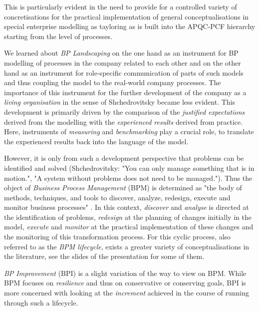 \documentclass[11pt,a4paper]{article}
\begin{document}
This is particularly evident in the need to provide for a controlled variety
of concretisations for the practical implementation of general
conceptualisations in special enterprise modelling as tayloring as is built
into the APQC-PCF hierarchy starting from the level of processes.

We learned about \emph{BP Landscaping} on the one hand as an instrument for BP
modelling of processes in the company related to each other and on the other
hand as an instrument for role-specific communication of parts of such models
and thus coupling the model to the real-world company processes. The
importance of this instrument for the further development of the company as a
\emph{living organisation} in the sense of Shchedrovitsky became less evident.
This development is primarily driven by the comparison of the \emph{justified
  expectations} derived from the modelling with the \emph{experienced results}
derived from practice. Here, instruments of \emph{measuring} and
\emph{benchmarking} play a crucial role, to translate the experienced results
back into the language of the model.

However, it is only from such a development perspective that problems can be
identified and solved (Shchedrovitsky: "You can only manage something that is
in motion.", "A system without problems does not need to be managed."). Thus
the object of \emph{Business Process Management} (BPM) is determined as "the
body of methods, techniques, and tools to discover, analyze, redesign, execute
and monitor business processes" \cite{Lindskog2018}. In this context,
\emph{discover} and \emph{analyse} is directed at the identification of
problems, \emph{redesign} at the planning of changes initially in the model,
\emph{execute} and \emph{monitor} at the practical implementation of these
changes and the monitoring of this transformation process. For this cyclic
process, also referred to as the \emph{BPM lifecycle}, exists a greater
variety of conceptualisations in the literature, see the slides of the
presentation for some of them.

\emph{BP Improvement} (BPI) is a slight variation of the way to view on BPM.
While BPM focuses on \emph{resilience} and thus on conservative or conserving
goals, BPI is more concerned with looking at the \emph{increment} achieved in
the course of running through such a lifecycle.
\end{document}
